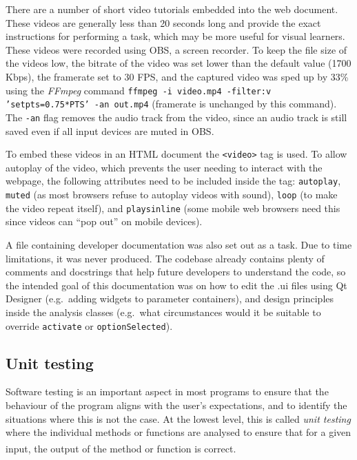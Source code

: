 \documentclass[12pt]{article}
\begin{document}
There are a number of short video tutorials embedded into the web document. These videos are generally less than 20 seconds long and provide the exact instructions for performing a task, which may be more useful for visual learners. These videos were recorded using OBS, a screen recorder. To keep the file size of the videos low, the bitrate of the video was set lower than the default value (1700 Kbps), the framerate set to 30 FPS, and the captured video was sped up by 33\% using the \textit{FFmpeg} command \texttt{ffmpeg -i video.mp4 -filter:v 'setpts=0.75*PTS' -an out.mp4} (framerate is unchanged by this command). The \texttt{-an} flag removes the audio track from the video, since an audio track is still saved even if all input devices are muted in OBS.

To embed these videos in an HTML document the \texttt{<video>} tag is used. To allow autoplay of the video, which prevents the user needing to interact with the webpage, the following attributes need to be included inside the tag: \texttt{autoplay}, \texttt{muted} (as most browsers refuse to autoplay videos with sound), \texttt{loop} (to make the video repeat itself), and \texttt{playsinline} (some mobile web browsers need this since videos can ``pop out'' on mobile devices).

A file containing developer documentation was also set out as a task. Due to time limitations, it was never produced. The codebase already contains plenty of comments and docstrings that help future developers to understand the code, so the intended goal of this documentation was on how to edit the .ui files using Qt Designer (e.g.~adding widgets to parameter containers), and design principles inside the analysis classes (e.g.~what circumstances would it be suitable to override \texttt{activate} or \texttt{optionSelected}).

\subsection{Unit testing}\label{ssec:unit_testing}

Software testing is an important aspect in most programs to ensure that the behaviour of the program aligns with the user's expectations, and to identify the situations where this is not the case. At the lowest level, this is called \textit{unit testing} where the individual methods or functions are analysed to ensure that for a given input, the output of the method or function is correct.\textsuperscript{\cite{testing}}
\end{document}
